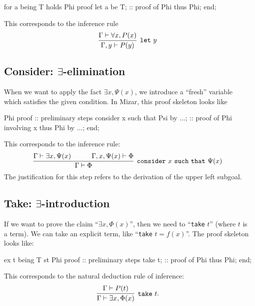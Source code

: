 \begin{mizar}
for a being T holds Phi
proof
  let a be T;
  :: proof of Phi
  thus Phi;
end;
\end{mizar}

This corresponds to the inference rule
\begin{equation}
\vcenter{\infer[\mathtt{let}~y]{\Gamma,y\vdash P(y)}{\Gamma\vdash\forall x,P(x)}}
\end{equation}

\subsection{Consider: $\exists$-elimination}
When we want to apply the fact $\exists x,\Psi(x)$, we introduce a
``fresh'' variable which satisfies the given condition. In Mizar, this
proof skeleton looks like
\begin{mizar}
Phi
proof
  :: preliminary steps
  consider x such that Psi by ...;
  :: proof of Phi involving x
  thus Phi by ...;
end;
\end{mizar}\medskip
This corresponds to the inference rule:
\begin{equation}
\vcenter{\infer[\mathtt{consider}~x~\mathtt{such~that}~\Psi(x)]{\Gamma\vdash\Phi}{%
  \Gamma\vdash\exists x,\Psi(x)
  &\qquad\Gamma,x,\Psi(x)\vdash\Phi}}
\end{equation}
The justification for this step refers to the derivation of the upper
left subgoal.

\subsection{Take: $\exists$-introduction}
If we want to prove the claim ``$\exists x,\Phi(x)$'', then we need to
``\verb#take# $t$'' (where $t$ is a term). We can take an explicit term,
like ``\verb#take# $t = f(x)$''. The proof skeleton looks like:
\begin{mizar}
ex t being T st Phi
proof
  :: preliminary steps
  take t;
  :: proof of Phi
  thus Phi;
end;
\end{mizar}
This corresponds to the natural deduction rule of inference:
\begin{equation}
  \vcenter{\infer[\mathtt{take}~t]{\Gamma\vdash\exists x,\Phi(x)}{\Gamma\vdash P(t)}}.
\end{equation}

